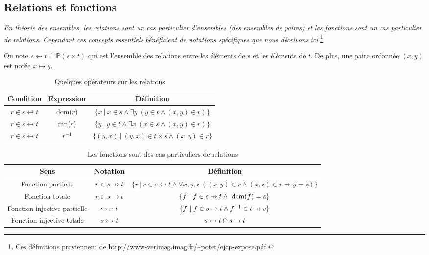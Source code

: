 \documentclass[10pt,a4paper]{article}
\newcommand{\Bequal}{\mathrel{\widehat{=}}}
\def\p#1{\mathrel{\ooalign{\hfil$\mapstochar\mkern 5mu$\hfil\cr$#1$}}}
\def \pfun  {\p\rightarrow}
\begin{document}
\subsection{Relations et fonctions}

\emph{En théorie des ensembles, les relations sont un cas particulier d'ensembles (des ensembles de paires) et les fonctions sont un cas particulier de relations. Cependant ces concepts essentiels bénéficient de notations spécifiques que nous décrivons ici.}\footnote{Ces définitions proviennent de \url{http://www-verimag.imag.fr/~potet/ejcp-expose.pdf}.}

On note  $ s \leftrightarrow t \Bequal \mathbb{P}(s \times t)$ qui est l'ensemble des relations entre les éléments de $s$ et les éléments de $t$. De plus, une paire ordonnée $(x, y)$ est notée $x \mapsto y$.

{\arraycolsep=1.4pt
\renewcommand{\arraystretch}{2}
\begin{table}
\centering
\begin{tabular}[h]{|c | c | c|}
\hline
\bf Condition & \bf Expression &  \bf Définition \tabularnewline
\hline 
$r \in s \leftrightarrow t$ & dom($r$) & $\{ x~|~x\in s \wedge \exists y~(y \in t \wedge (x, y)  \in r)\}$  \tabularnewline
$r \in s \leftrightarrow t$ & ran($r$) & $\{y~|~y \in t \wedge \exists x~(x \in s \wedge (x, y) \in r)\}$ \tabularnewline
$r \in s \leftrightarrow t$ & $r^{-1}$ & $\{(y, x)~|~(y, x) \in t \times s \wedge (x, y) \in r\}$ \tabularnewline
\hline
\end{tabular}
\caption{Quelques opérateurs sur les relations}
\end{table}
}

{\arraycolsep=1.4pt
\renewcommand{\arraystretch}{2}
\begin{table}
\centering
\begin{tabular}[h]{|c | c | c|}
\hline
\bf Sens & \bf Notation &  \bf Définition \tabularnewline
\hline 
Fonction partielle & $r \in s \pfun t$ & $\{ r~|~r \in s \leftrightarrow t \wedge \forall x, y, z~( (x,y) \in r \wedge (x,z) \in r \Rightarrow y=z )\}$  \tabularnewline
Fonction totale &  $r \in s \rightarrow t$ & $\{f~|~f \in s \pfun t \wedge \text{ dom}(f) = s\}$ \tabularnewline
Fonction injective partielle & $s \p\rightarrowtail t$ & $\{f~|~f \in s \pfun t \wedge f^{-1} \in  t \pfun s\}$ \tabularnewline
Fonction injective totale & $s \rightarrowtail t$ & $s \p\rightarrowtail t \cap s \rightarrow t$ \tabularnewline 
\hline
\end{tabular}
\caption{Les fonctions sont des cas particuliers de relations}
\end{table}
}
\end{document}
